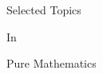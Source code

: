 \documentclass[]{article}
\begin{document}
\begingroup
{}
\thispagestyle{empty}
\color{cover}
\begin{center}
    \vspace*{1.5cm}
    {\fontsize{50pt}{30pt}\selectfont\Acmefont
    Selected Topics\par
    In\par
    Pure Mathematics
    }
\end{center}
\endgroup
\end{document}
